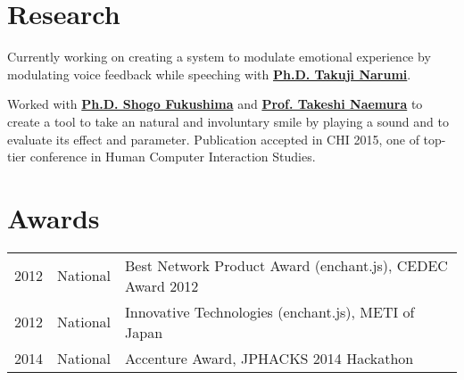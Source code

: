 \documentclass[letterpaper]{deedy-resume} %
\begin{document}
\begin{minipage}[t]{0.66\textwidth}

\section{Research}

Currently working on creating a system to modulate emotional experience by modulating voice feedback while speeching with \textbf{\href{http://www.cyber.t.u-tokyo.ac.jp/~narumi/}{Ph.D. Takuji Narumi}}. 

\vspace{2mm} %


Worked with \textbf{\href{http://shogofukushima.com/}{Ph.D. Shogo Fukushima}} and \textbf{\href{http://nae-lab.org/~naemura/}{Prof. Takeshi Naemura}} to create a tool to take an natural and involuntary smile by playing a sound and to evaluate its effect and parameter. Publication accepted in CHI 2015, one of top-tier conference in Human Computer Interaction Studies.

\vspace{2mm} %


\section{Awards} 

\begin{tabular}{rll}
2012 & National & Best Network Product Award (enchant.js), CEDEC Award 2012\\
2012 & National & Innovative Technologies (enchant.js), METI of Japan\\
2014 & National & Accenture Award, JPHACKS 2014 Hackathon\\
\end{tabular}

\sectionspace %


\end{minipage} %
\end{document}
